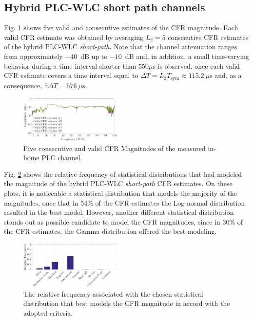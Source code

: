 \documentclass[journal]{IEEEtran}
\begin{document}
\subsection{Hybrid PLC-WLC short path channels}\label{sec:MMHYBS}

 Fig. \ref{respfreqsW} shows five valid and consecutive estimates of the \ac{CFR} magnitude. Each valid \ac{CFR} estimate was obtained by averaging  $L_2=5$ consecutive \ac{CFR} estimates of the hybrid \ac{PLC}-\ac{WLC} \textit{short-path}. Note that the channel attenuation ranges from approximately $-40$~dB up to $-10$~dB and, in addition, a small time-varying behavior during a time interval shorter than $550\mu$s is observed, once each valid \ac{CFR} estimate covers a time interval equal to $\Delta T = L_2 T_{\textrm{sym}} \approx 115.2~\mu$s and, as a consequence, $5\Delta T = 576~\mu$s. 

\begin{figure}[h]
	\centering
	\includegraphics[width=0.45\textwidth]{images/respfreqsW.eps}
	\caption{Five consecutive and valid CFR Magnitudes of the measured in-home PLC channel.}
	\label{respfreqsW}
\end{figure}

Fig. \ref{MAG_percentsW} shows the relative frequency of statistical distributions that had modeled the magnitude of the hybrid \ac{PLC}-\ac{WLC} \textit{short-path} \ac{CFR} estimates. On these plots, it is noticeable a statistical distribution that models the majority of the magnitudes, once that in 54\% of the \ac{CFR} estimates the Log-normal distribution resulted in the best model. However, another different statistical distribution stands out as possible candidate to model the \ac{CFR} magnitudes, since in 30\% of the \ac{CFR} estimates, the Gamma distribution offered the best modeling. 

\begin{figure}[h!]
	\centering
	\includegraphics[width=0.45\textwidth]{images/MAG_percentsW.eps}
	\caption{The relative frequency associated with the chosen statistical distribution that best models the CFR magnitude in accord with the adopted criteria.}
	\label{MAG_percentsW}
\end{figure}
\end{document}
